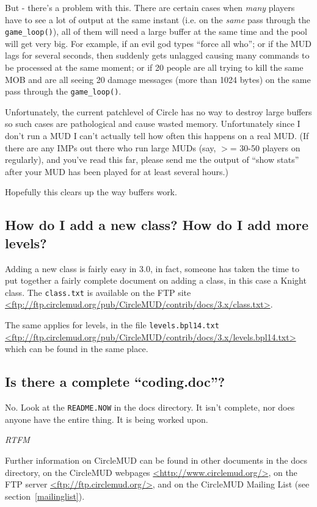 \documentclass[11pt]{article}
\begin{document}
\par
But - there's a problem with this.  There are certain cases when {\em many} players have to see a lot of output at the same instant (i.e. on the {\em same} pass through the \texttt{game\_loop()}), all of them will need a large buffer at the same time and the pool will get very big.  For example, if
an evil god types ``force all who''; or if the MUD lags for several seconds, then suddenly gets unlagged causing many commands to be processed at the same moment; or if 20 people are all trying to kill the same MOB and are all seeing 20 damage messages (more than 1024 bytes) on the same pass through the \texttt{game\_loop()}.
\par
Unfortunately, the current patchlevel of Circle has no way to destroy large buffers so such cases are pathological and cause wasted memory.  Unfortunately since I don't run a MUD I can't actually tell how often this happens on a real MUD.  (If there are any IMPs out there who run large MUDs (say, $>$= 30-50 players on regularly), and you've read this far, please send me the output of ``show stats'' after your MUD has been played for at least several hours.) 
\par
Hopefully this clears up the way buffers work.

\subsection{How do I add a new class?  How do I add more levels?}
Adding a new class is fairly easy in 3.0, in fact, someone has taken the time to put together a fairly complete document on adding a class, in this case a Knight class. The \texttt{class.txt} is available on the FTP site \url{<ftp://ftp.circlemud.org/pub/CircleMUD/contrib/docs/3.x/class.txt>}.
\par
The same applies for levels, in the file \texttt{levels.bpl14.txt} \url{<ftp://ftp.circlemud.org/pub/CircleMUD/contrib/docs/3.x/levels.bpl14.txt>} which can be found in the same place.

\subsection{Is there a complete ``coding.doc''?}
No.  Look at the \texttt{README.NOW} in the docs directory.  It isn't complete, nor does anyone have the entire thing.  It is being worked upon.
\par
{\em RTFM}
\par
Further information on CircleMUD can be found in other documents in the docs directory, on the CircleMUD webpages \url{<http://www.circlemud.org/>}, on the FTP server \url{<ftp://ftp.circlemud.org/>}, and on the CircleMUD Mailing List (see section~\vref{mailinglist}).
\end{document}
